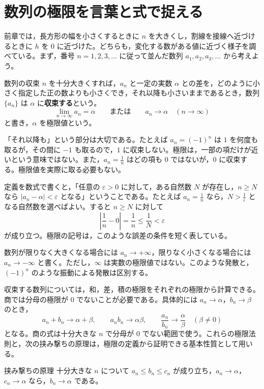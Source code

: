 \section{数列の極限を言葉と式で捉える}\label{節:数列極限}
前章では，長方形の幅を小さくするときに $n$ を大きくし，割線を接線へ近づけるときに $h$ を $0$ に近づけた。どちらも，変化する数がある値に近づく様子を調べている。まず，番号 $n=1,2,3,\ldots$ に従って並んだ数列 $a_1,a_2,a_3,\ldots$ から考えよう。

\begin{definition}{数列の収束}
$n$ を十分大きくすれば，$a_n$ と一定の実数 $\alpha$ との差を，どのように小さく指定した正の数よりも小さくでき，それ以降も小さいままであるとき，数列 $\{a_n\}$ は $\alpha$ に\textbf{収束する}という。
\[
 \lim_{n\to\infty}a_n=\alpha
 \qquad\text{または}\qquad a_n\to\alpha\quad(n\to\infty)
\]
と書き，$\alpha$ を極限値という。
\end{definition}

「それ以降も」という部分は大切である。たとえば $a_n=(-1)^n$ は $1$ を何度も取るが，その間に $-1$ も取るので，$1$ に収束しない。極限は，一部の項だけが近いという意味ではない。また，$a_n=\frac1n$ はどの項も $0$ ではないが，$0$ に収束する。極限値を実際に取る必要もない。

定義を数式で書くと，「任意の $\varepsilon>0$ に対して，ある自然数 $N$ が存在し，$n\ge N$ なら $|a_n-\alpha|<\varepsilon$ となる」ということである。たとえば $a_n=\frac1n$ なら，$N>\frac1\varepsilon$ となる自然数を選べばよい。すると $n\ge N$ に対して
\[
 \left|\frac1n-0\right|=\frac1n\le\frac1N<\varepsilon
\]
が成り立つ。極限の記号は，このような誤差の条件を短く表している。

数列が限りなく大きくなる場合には $a_n\to+\infty$，限りなく小さくなる場合には $a_n\to-\infty$ と書く。ただし，$\infty$ は実数の極限値ではない。このような発散と，$(-1)^n$ のような振動による発散は区別する。

収束する数列については，和，差，積の極限をそれぞれの極限から計算できる。商では分母の極限が $0$ でないことが必要である。具体的には $a_n\to\alpha$，$b_n\to\beta$ のとき，
\[
 a_n+b_n\to\alpha+\beta,\qquad
 a_nb_n\to\alpha\beta,\qquad
 \frac{a_n}{b_n}\to\frac\alpha\beta\quad(\beta\ne0)
\]
となる。商の式は十分大きな $n$ で分母が $0$ でない範囲で使う。これらの極限法則と，次の挟み撃ちの原理は，極限の定義から証明できる基本性質として用いる。

\begin{theorem}{挟み撃ちの原理}
十分大きな $n$ について $a_n\le b_n\le c_n$ が成り立ち，$a_n\to\alpha$，$c_n\to\alpha$ なら，$b_n\to\alpha$ である。
\end{theorem}

